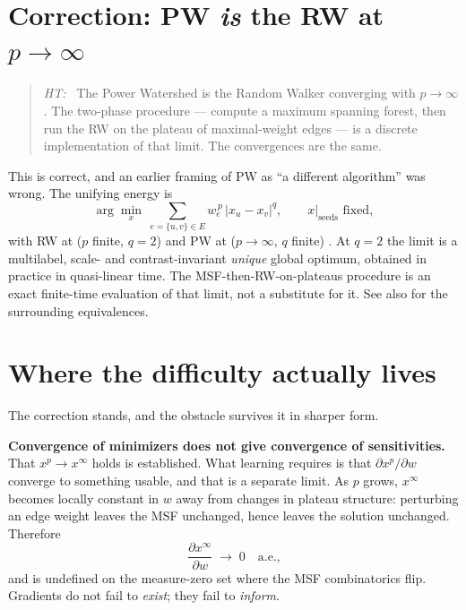 \documentclass[11pt,a4paper]{article}
\newcommand{\claim}[1]{\medskip\noindent\textbf{#1}\quad}
\newenvironment{position}[1]
  {\begin{quote}\noindent\textit{#1:}\ }
  {\end{quote}}
\newcommand{\we}{w_{e}}
\theoremstyle{definition}
\begin{document}
\section{Correction: PW \emph{is} the RW at $p\to\infty$}
\label{sec:correction}

\begin{position}{HT}
The Power Watershed is the Random Walker converging with $p\to\infty$.
The two-phase procedure --- compute a maximum spanning forest, then run
the RW on the plateau of maximal-weight edges --- is a discrete
implementation of that limit. The convergences are the same.
\end{position}

\noindent
This is correct, and an earlier framing of PW as ``a different
algorithm'' was wrong. The unifying energy is
\begin{equation}
  \arg\min_{x}\ \sum_{e=\{u,v\}\in E} \we^{\,p}\,\lvert x_u - x_v\rvert^{q},
  \qquad x\big|_{\text{seeds}} \text{ fixed},
  \label{eq:pw}
\end{equation}
with RW at ($p$ finite, $q=2$) and PW at ($p\to\infty$, $q$ finite)
\citep{couprie2009power,couprie2011power}. At $q=2$ the limit is a
multilabel, scale- and contrast-invariant \emph{unique} global optimum,
obtained in practice in quasi-linear time. The MSF-then-RW-on-plateaus
procedure is an exact finite-time evaluation of that limit, not a
substitute for it. See also
\citet{allene2007links,cousty2009watershed} for the surrounding
equivalences.

\section{Where the difficulty actually lives}
\label{sec:sensitivity}

The correction stands, and the obstacle survives it in sharper form.

\claim{Convergence of minimizers does not give convergence of sensitivities.}
That $x^{p} \to x^{\infty}$ holds is established. What learning requires
is that $\partial x^{p}/\partial w$ converge to something usable, and
that is a separate limit. As $p$ grows, $x^{\infty}$ becomes locally
constant in $w$ away from changes in plateau structure: perturbing an
edge weight leaves the MSF unchanged, hence leaves the solution
unchanged. Therefore
\begin{equation}
  \frac{\partial x^{\infty}}{\partial w} \;\longrightarrow\; 0
  \quad \text{a.e.,}
\end{equation}
and is undefined on the measure-zero set where the MSF combinatorics
flip. Gradients do not fail to \emph{exist}; they fail to \emph{inform}.
\end{document}
